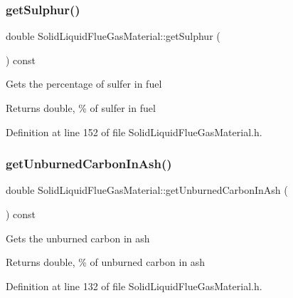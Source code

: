 \mbox{\label{class_solid_liquid_flue_gas_material_abe35d8ff283bfa5aadcf00f9906025ae}} 
\subsubsection{\texorpdfstring{get\+Sulphur()}{getSulphur()}}
{\footnotesize\ttfamily double Solid\+Liquid\+Flue\+Gas\+Material\+::get\+Sulphur (\begin{DoxyParamCaption}{ }\end{DoxyParamCaption}) const\hspace{0.3cm}{\ttfamily [inline]}}

Gets the percentage of sulfer in fuel \begin{DoxyReturn}{Returns}
double, \% of sulfer in fuel 
\end{DoxyReturn}


Definition at line 152 of file Solid\+Liquid\+Flue\+Gas\+Material.\+h.

\mbox{\label{class_solid_liquid_flue_gas_material_a53ac34a949168a35297ab3afb9eb2c7b}} 
\subsubsection{\texorpdfstring{get\+Unburned\+Carbon\+In\+Ash()}{getUnburnedCarbonInAsh()}}
{\footnotesize\ttfamily double Solid\+Liquid\+Flue\+Gas\+Material\+::get\+Unburned\+Carbon\+In\+Ash (\begin{DoxyParamCaption}{ }\end{DoxyParamCaption}) const\hspace{0.3cm}{\ttfamily [inline]}}

Gets the unburned carbon in ash \begin{DoxyReturn}{Returns}
double, \% of unburned carbon in ash 
\end{DoxyReturn}


Definition at line 132 of file Solid\+Liquid\+Flue\+Gas\+Material.\+h.

